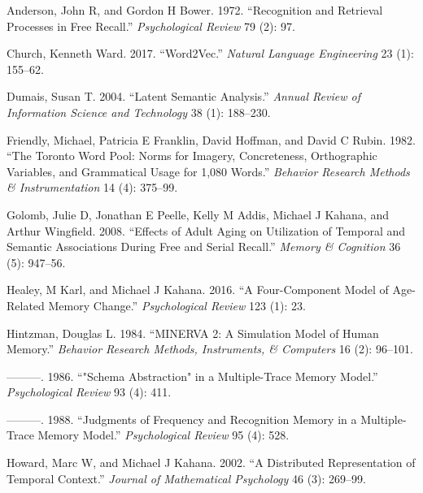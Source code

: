 \documentclass[
  letterpaper,
  DIV=11]{article}
\newlength{\cslhangindent}
\newlength{\cslentryspacingunit} %
\newenvironment{CSLReferences}[2] %
 {%
  \setlength{\parindent}{0pt}
  \ifodd #1
  \let\oldpar\par
  \def\par{\hangindent=\cslhangindent\oldpar}
  \fi
  \setlength{\parskip}{#2\cslentryspacingunit}
 }%
 {}
\begin{document}
\hypertarget{refs}{}
\begin{CSLReferences}{1}{0}
\leavevmode{}%
Anderson, John R, and Gordon H Bower. 1972. {``Recognition and Retrieval
Processes in Free Recall.''} \emph{Psychological Review} 79 (2): 97.

\leavevmode{}%
Church, Kenneth Ward. 2017. {``Word2Vec.''} \emph{Natural Language
Engineering} 23 (1): 155--62.

\leavevmode{}%
Dumais, Susan T. 2004. {``Latent Semantic Analysis.''} \emph{Annual
Review of Information Science and Technology} 38 (1): 188--230.

\leavevmode{}%
Friendly, Michael, Patricia E Franklin, David Hoffman, and David C
Rubin. 1982. {``The Toronto Word Pool: Norms for Imagery, Concreteness,
Orthographic Variables, and Grammatical Usage for 1,080 Words.''}
\emph{Behavior Research Methods \& Instrumentation} 14 (4): 375--99.

\leavevmode{}%
Golomb, Julie D, Jonathan E Peelle, Kelly M Addis, Michael J Kahana, and
Arthur Wingfield. 2008. {``Effects of Adult Aging on Utilization of
Temporal and Semantic Associations During Free and Serial Recall.''}
\emph{Memory \& Cognition} 36 (5): 947--56.

\leavevmode{}%
Healey, M Karl, and Michael J Kahana. 2016. {``A Four-Component Model of
Age-Related Memory Change.''} \emph{Psychological Review} 123 (1): 23.

\leavevmode{}%
Hintzman, Douglas L. 1984. {``MINERVA 2: A Simulation Model of Human
Memory.''} \emph{Behavior Research Methods, Instruments, \& Computers}
16 (2): 96--101.

\leavevmode{}%
---------. 1986. {``"Schema Abstraction" in a Multiple-Trace Memory
Model.''} \emph{Psychological Review} 93 (4): 411.

\leavevmode{}%
---------. 1988. {``Judgments of Frequency and Recognition Memory in a
Multiple-Trace Memory Model.''} \emph{Psychological Review} 95 (4): 528.

\leavevmode{}%
Howard, Marc W, and Michael J Kahana. 2002. {``A Distributed
Representation of Temporal Context.''} \emph{Journal of Mathematical
Psychology} 46 (3): 269--99.


\end{CSLReferences}
\end{document}
